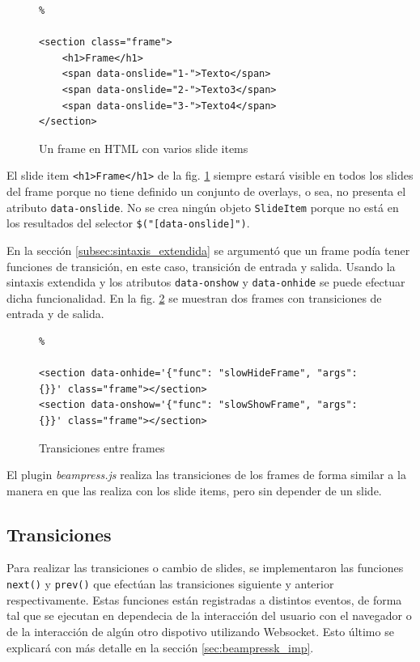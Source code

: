			\begin{figure}[htb]%
				\begin{lstlisting}%

<section class="frame">
	<h1>Frame</h1>
	<span data-onslide="1-">Texto</span>
	<span data-onslide="2-">Texto3</span>
	<span data-onslide="3-">Texto4</span>
</section>
				\end{lstlisting}
				\caption{Un frame en HTML con varios slide items}
				\label{fig:frame_html_slides}
			\end{figure}

			El slide item \texttt{<h1>Frame</h1>} de la fig. \ref{fig:frame_html_slides} siempre estará visible en todos los slides del frame porque no tiene definido un conjunto de overlays, o sea, no presenta el atributo \texttt{data-onslide}. No se crea ningún objeto \texttt{SlideItem} porque no está en los resultados del selector \texttt{\$("[data-onslide]")}.


			En la sección \ref{subsec:sintaxis_extendida} se argumentó que un frame podía tener funciones de transición, en este caso, transición de entrada y salida. Usando la sintaxis extendida y los atributos \texttt{data-onshow} y \texttt{data-onhide} se puede efectuar dicha funcionalidad. En la fig. \ref{fig:frames_transitions} se muestran dos frames con transiciones de entrada y de salida.


		\begin{figure}[htb]%
			\begin{lstlisting}%

<section data-onhide='{"func": "slowHideFrame", "args": {}}' class="frame"></section>
<section data-onshow='{"func": "slowShowFrame", "args": {}}' class="frame"></section>
			\end{lstlisting}
		\caption{Transiciones entre frames}
		\label{fig:frames_transitions}
		\end{figure}	

		El plugin \textit{beampress.js} realiza las transiciones de los frames de forma similar a la manera en que las realiza con los slide items, pero sin depender de un slide.

		\subsection{Transiciones} %
		\label{sub:transiciones}
			Para realizar las transiciones o cambio de slides, se implementaron las funciones \texttt{next()} y \texttt{prev()} que efectúan las transiciones siguiente y anterior respectivamente. Estas funciones están registradas a distintos eventos, de forma tal que se ejecutan en dependecia de la interacción del usuario con el navegador o de la interacción de algún otro dispotivo utilizando Websocket. Esto último se explicará con más detalle en la sección \ref{sec:beampressk_imp}.

